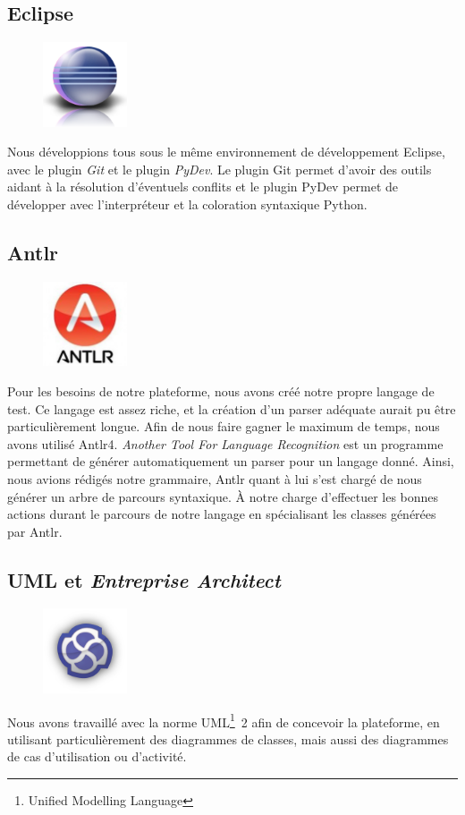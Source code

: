 \subsection{Eclipse}
\begin{figure}
	\vspace{-30px}
	\includegraphics[width=2.5cm]{contents/images/logoEclipse.png}
\end{figure}
Nous développions tous sous le même environnement de développement Eclipse, avec le plugin \textit{Git} et le plugin \textit{PyDev}. Le
plugin Git permet d'avoir des outils aidant à la résolution d'éventuels conflits et le plugin PyDev permet de développer avec l'interpréteur
et la coloration syntaxique Python. 
\subsection{Antlr}
\begin{figure}
	\includegraphics[width=2.5cm]{contents/images/antlr.jpg}
\end{figure}
Pour les besoins de notre plateforme, nous avons créé notre propre langage de test. Ce langage est assez riche, et la création d'un parser adéquate aurait pu être particulièrement longue. Afin de nous faire gagner le maximum de temps, nous avons utilisé Antlr4.  \textit{Another Tool For Language Recognition} est un programme permettant de générer automatiquement un parser pour un langage donné. Ainsi, nous avions rédigés notre grammaire, Antlr quant à lui s'est chargé de nous générer un arbre de parcours syntaxique. À notre charge d'effectuer les bonnes actions durant le parcours de notre langage en spécialisant les classes générées par Antlr.

\subsection{UML et \textit{Entreprise Architect}}
\begin{figure}
	\includegraphics[width=2.5cm]{contents/images/logoEnterpriseArchitect.png}
\end{figure}
Nous avons travaillé avec la norme UML\footnote{Unified Modelling Language}~2 afin de concevoir la plateforme, en utilisant particulièrement des diagrammes de classes, mais aussi des diagrammes de cas d'utilisation ou d'activité. 

